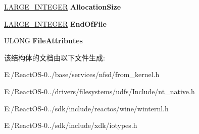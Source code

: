 \begin{DoxyCompactItemize}
\hyperlink{union___l_a_r_g_e___i_n_t_e_g_e_r}{L\+A\+R\+G\+E\+\_\+\+I\+N\+T\+E\+G\+ER} {\bfseries Allocation\+Size}
\item 
\mbox{\label{struct___f_i_l_e___n_e_t_w_o_r_k___o_p_e_n___i_n_f_o_r_m_a_t_i_o_n_a6d5128d3a1662f74c45b6fb90d53f04c}} 
\hyperlink{union___l_a_r_g_e___i_n_t_e_g_e_r}{L\+A\+R\+G\+E\+\_\+\+I\+N\+T\+E\+G\+ER} {\bfseries End\+Of\+File}
\item 
\mbox{\label{struct___f_i_l_e___n_e_t_w_o_r_k___o_p_e_n___i_n_f_o_r_m_a_t_i_o_n_a8480c0064af081ed3ff798611b4cde40}} 
U\+L\+O\+NG {\bfseries File\+Attributes}
\end{DoxyCompactItemize}


该结构体的文档由以下文件生成\+:\begin{DoxyCompactItemize}
\item 
E\+:/\+React\+O\+S-\/0../base/services/nfsd/from\+\_\+kernel.\+h\item 
E\+:/\+React\+O\+S-\/0../drivers/filesystems/udfs/\+Include/nt\+\_\+native.\+h\item 
E\+:/\+React\+O\+S-\/0../sdk/include/reactos/wine/winternl.\+h\item 
E\+:/\+React\+O\+S-\/0../sdk/include/xdk/iotypes.\+h\end{DoxyCompactItemize}
